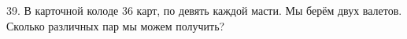 39. В карточной колоде 36 карт, по девять каждой масти. Мы берём двух валетов. Сколько различных пар мы можем получить?\\
